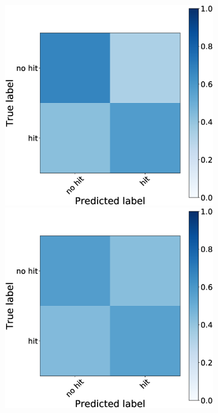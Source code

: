 \documentclass[journal]{IEEEtran}
\providecommand{\DIFaddbeginFL}{} %
\providecommand{\DIFdelbeginFL}{} %
\providecommand{\DIFdelendFL}{} %
\newcommand{\DIFscaledelfig}{0.5}
\newlength{\DIFdelgraphicswidth} %
\newlength{\DIFdelgraphicsheight} %
\newcommand{\DIFaddincludegraphics}[2][]{{\color{blue}\fbox{\DIFOincludegraphics[#1]{#2}}}} %
\newcommand{\DIFdelincludegraphics}[2][]{%
\sbox{\DIFdelgraphicsbox}{\DIFOincludegraphics[#1]{#2}}%
\settoboxwidth{\DIFdelgraphicswidth}{\DIFdelgraphicsbox} %
\settoboxtotalheight{\DIFdelgraphicsheight}{\DIFdelgraphicsbox} %
\scalebox{\DIFscaledelfig}{%
\parbox[b]{\DIFdelgraphicswidth}{\usebox{\DIFdelgraphicsbox}\\[-\baselineskip] \rule{\DIFdelgraphicswidth}{0em}}\llap{\resizebox{\DIFdelgraphicswidth}{\DIFdelgraphicsheight}{%
\setlength{\unitlength}{\DIFdelgraphicswidth}%
\begin{picture}(1,1)%
\thicklines\linethickness{2pt} %
{\color[rgb]{1,0,0}\put(0,0){\framebox(1,1){}}}%
{\color[rgb]{1,0,0}\put(0,0){\line( 1,1){1}}}%
{\color[rgb]{1,0,0}\put(0,1){\line(1,-1){1}}}%
\end{picture}%
}\hspace*{3pt}}} %
} %
\DeclareRobustCommand{\DIFaddbeginFL}{\DIFOaddbeginFL \let\includegraphics\DIFaddincludegraphics} %
\DeclareRobustCommand{\DIFdelbeginFL}{\DIFOdelbeginFL \let\includegraphics\DIFdelincludegraphics} %
\DeclareRobustCommand{\DIFdelendFL}{\DIFOaddendFL \let\includegraphics\DIFOincludegraphics} %
\begin{document}
{{\begin{figure}[h!]
\begin{subfigure}{0.5\textwidth}
\DIFdelbeginFL %
\DIFdelendFL \DIFaddbeginFL \includegraphics[scale=0.14]{revisedimages/matrix_3.eps}
\includegraphics[scale=0.14]{revisedimages/matrix_4.eps}\\

\end{subfigure}
\end{figure}}}
\end{document}
